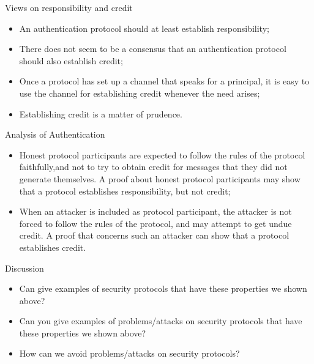 \documentclass[12pt,table,xcolor={dvipsnames}]{beamer}
\begin{document}
\begin{frame}{Views on responsibility and credit}
\begin{itemize}
\item An authentication protocol should at least establish responsibility;\pause
\item There does not seem to be a consensus that an authentication protocol should also
establish credit;\pause
\item Once a protocol has set up a channel that speaks for a principal, it is easy to use the channel for establishing credit whenever the need arises;\pause
\item Establishing credit is a matter of prudence.
\end{itemize}
\end{frame}

\begin{frame}{Analysis of Authentication}
\begin{itemize}
\item Honest protocol participants are expected to follow the rules of the protocol faithfully,and not to try to obtain credit for messages that they did not generate
themselves. A proof about honest protocol participants may show that a protocol
establishes responsibility, but not credit;\pause
\item When an attacker is included as protocol participant, the attacker is not forced
to follow the rules of the protocol, and may attempt to get undue credit. A proof
that concerns such an attacker can show that a protocol establishes credit.
\end{itemize}
\end{frame}

\begin{frame}{Discussion}
\begin{itemize}
\item Can give examples of security protocols that have these properties we shown above?\pause
\item Can you give examples of problems/attacks on security protocols that have these properties we shown above?\pause
\item How can we avoid problems/attacks on security protocols?
\end{itemize}
\end{frame}
\end{document}
